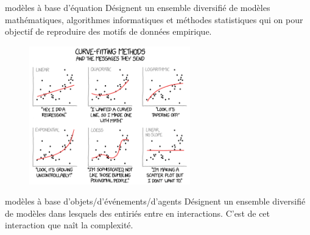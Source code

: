 \documentclass[newPxFont]{beamer}
\begin{document}
\begin{frame}[c]{modèles à base d’équation}
  \vspace{-2em}
  Désignent un ensemble diversifié de modèles mathématiques, algorithmes informatiques et méthodes statistiques qui on pour objectif de reproduire des motifs de données empirique.
  \begin{figure}
   \includegraphics[height=6cm]{img/a_curve_fitting.png}
  \end{figure}

\end{frame}

\begin{frame}[c]{modèles à base d’objets/d’événements/d’agents}
  \vspace{-2em}
  Désignent un ensemble diversifié de modèles dans lesquels des entiriés entre en interactions. C'est de cet interaction que naît la complexité.
  \begin{figure}
   	\centering
   		\hspace{0.2em} %
      \hspace{0.2em} %
  \end{figure}

\end{frame}
\end{document}
